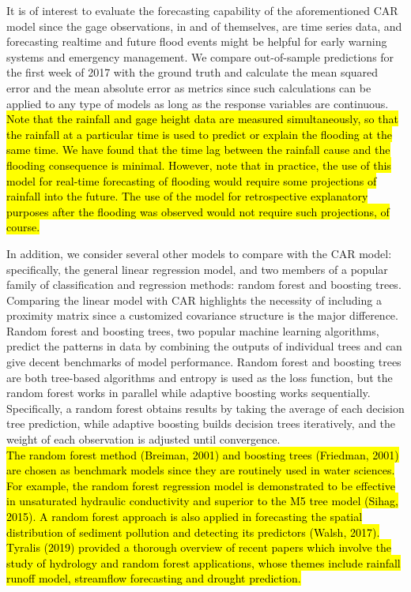 It is of interest to evaluate the forecasting capability of the aforementioned CAR model since the gage observations, in and of themselves, are time series data, and forecasting realtime and future flood events might be helpful for early warning systems and emergency management.
We compare out-of-sample predictions for the first week of 2017 with the ground truth and calculate the mean squared error and the mean absolute error as metrics since such calculations can be applied to any type of models as long as the response variables are continuous.
\hl{Note that the rainfall and gage height data are measured simultaneously, so that the rainfall at a particular time is used to predict or explain the flooding at the same time. We have found that the time lag between the rainfall cause and the flooding consequence is minimal.  However, note that in practice, the use of this model for real-time forecasting of flooding would require some projections of rainfall into the future. The use of the model for retrospective explanatory purposes after the flooding was observed would not require such projections, of course.}

In addition, we consider several other models to compare with the CAR model: specifically, the general linear regression model, and two members of a popular family of classification and regression methods:  random forest and boosting trees.
 Comparing the linear model with CAR highlights the necessity of including a proximity matrix since a customized covariance structure is the major difference.
 Random forest and boosting trees, two popular machine learning algorithms, predict the patterns in data by combining the outputs of individual trees and can give decent benchmarks of model performance.
 Random forest and boosting trees are both tree-based algorithms and entropy is used as the loss function, but the random forest works in parallel while adaptive boosting works sequentially.
 Specifically, a random forest obtains results by taking the average of each decision tree prediction, while adaptive boosting builds decision trees iteratively, and the weight of each observation is adjusted until convergence. \\

\hl{The random forest method (Breiman, 2001) and boosting trees (Friedman, 2001) are chosen as benchmark models since they are routinely used in water sciences.
For example, the random forest regression model is demonstrated to be effective in unsaturated hydraulic conductivity and superior to the M5 tree model (Sihag, 2015).
A random forest approach is also applied in forecasting the spatial distribution of sediment pollution and detecting its predictors (Walsh, 2017).
Tyralis (2019) provided a thorough overview of recent papers which involve the study of hydrology and random forest applications, whose themes include rainfall runoff model, streamflow forecasting and  drought prediction.}\\

